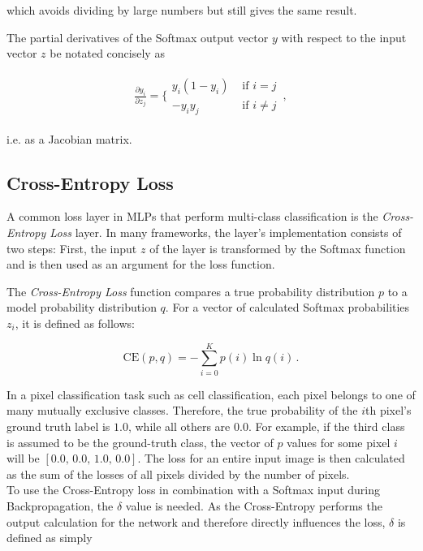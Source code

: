 \noindent which avoids dividing by large numbers but still gives the same result. \cite[p. 81]{deeplearning_book}

The partial derivatives of the Softmax output vector $y$ with respect to the input vector $z$ be notated concisely as

\begin {align}
	\frac{\partial y_i}{\partial z_j} = \bigg \{ \begin {array}{ll}
								y_i(1 - y_i)& \text{ if } i = j \\
								-y_i y_j& \text{ if } i \neq j
							\end{array} \,,
	\label{eq:softmax_deriv}
\end {align}

i.e. as a Jacobian matrix. \cite[]{bishop_pattern}


		\subsection{Cross-Entropy Loss}
\label{subsec:cross_ent}

A common loss layer in MLPs that perform multi-class classification is the \textit{Cross-Entropy Loss} layer. In many frameworks, the layer's implementation consists of two steps: First, the input $z$ of the layer is transformed by the Softmax function and is then used as an argument for the loss function.

The \textit{Cross-Entropy Loss} function compares a true probability distribution $p$ to a model probability distribution $q$. For a vector of calculated Softmax probabilities $z_i$, it is defined as follows:

\[ \text{CE}(p, q) = -\sum \limits_{i = 0}^{K} p(i) \ln q(i) \,. \]

\noindent In a pixel classification task such as cell classification, each pixel belongs to one of many mutually exclusive classes. Therefore, the true probability of the $i$th pixel's ground truth label is $1.0$, while all others are $0.0$. For example, if the third class is assumed to be the ground-truth class, the vector of $p$ values for some pixel $i$ will be $[0.0,\, 0.0,\, 1.0,\, 0.0]$. The loss for an entire input image is then calculated as the sum of the losses of all pixels divided by the number of pixels.\\

\noindent To use the Cross-Entropy loss in combination with a Softmax input during Backpropagation, the $\delta$ value is needed. As the Cross-Entropy performs the output calculation for the network and therefore directly influences the loss, $\delta$ is defined as simply

